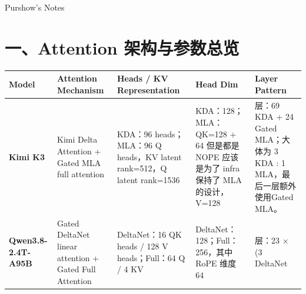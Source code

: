 \documentclass[
  11pt,
  a4paper,
  fontset=none]{ctexart}
\author{}
\date{}
\newcounter{none} %
\begin{document}
\clearpage{}\begin{landscape}\thispagestyle{empty}\noindent\hfill{\small\sffamily\color{attentiongray}Purshow's Notes}\par\vspace{-0.6em}

\section{一、Attention
架构与参数总览}\label{ux4e00attention-ux67b6ux6784ux4e0eux53c2ux6570ux603bux89c8}

{\def\LTcaptype{none} %
\begin{longtable}[]{@{}
  >{\raggedright\arraybackslash}p{}
  >{\raggedright\arraybackslash}p{}
  >{\raggedright\arraybackslash}p{}
  >{\raggedright\arraybackslash}p{}
  >{\raggedright\arraybackslash}p{}@{}}
\toprule\noalign{}
\begin{minipage}[b]{\linewidth}\raggedright
Model
\end{minipage} & \begin{minipage}[b]{\linewidth}\raggedright
Attention Mechanism
\end{minipage} & \begin{minipage}[b]{\linewidth}\raggedright
Heads / KV Representation
\end{minipage} & \begin{minipage}[b]{\linewidth}\raggedright
Head Dim
\end{minipage} & \begin{minipage}[b]{\linewidth}\raggedright
Layer Pattern
\end{minipage} \\
\midrule\noalign{}
\endhead
\bottomrule\noalign{}
\endlastfoot
\textbf{Kimi K3} & Kimi Delta Attention + Gated MLA full attention &
KDA：96 heads；MLA：96 Q heads，KV latent rank=512，Q latent rank=1536 &
KDA：128；MLA：QK=128 + 64 但是都是NOPE 应该是为了 infra 保持了 MLA
的设计，V=128 & 93 层：69 KDA + 24 Gated MLA；大体为 3 KDA : 1
MLA，最后一层额外使用Gated MLA。 \\
\textbf{Qwen3.8-2.4T-A95B} & Gated DeltaNet linear attention + Gated
Full Attention & DeltaNet：16 QK heads / 128 V heads；Full：64 Q / 4 KV
& DeltaNet：128；Full：256，其中 RoPE 维度 64 & 92 层：23 × (3 DeltaNet

\end{longtable}}
\end{landscape}
\end{document}
